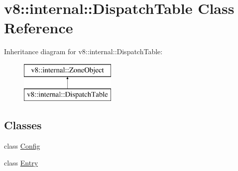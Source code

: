 \hypertarget{classv8_1_1internal_1_1_dispatch_table}{}\section{v8\+:\+:internal\+:\+:Dispatch\+Table Class Reference}
\label{classv8_1_1internal_1_1_dispatch_table}
Inheritance diagram for v8\+:\+:internal\+:\+:Dispatch\+Table\+:\begin{figure}[H]
\begin{center}
\leavevmode
\includegraphics[height=2.000000cm]{classv8_1_1internal_1_1_dispatch_table}
\end{center}
\end{figure}
\subsection*{Classes}
\begin{DoxyCompactItemize}
\item 
class \hyperlink{classv8_1_1internal_1_1_dispatch_table_1_1_config}{Config}
\item 
class \hyperlink{classv8_1_1internal_1_1_dispatch_table_1_1_entry}{Entry}
\end{DoxyCompactItemize}
